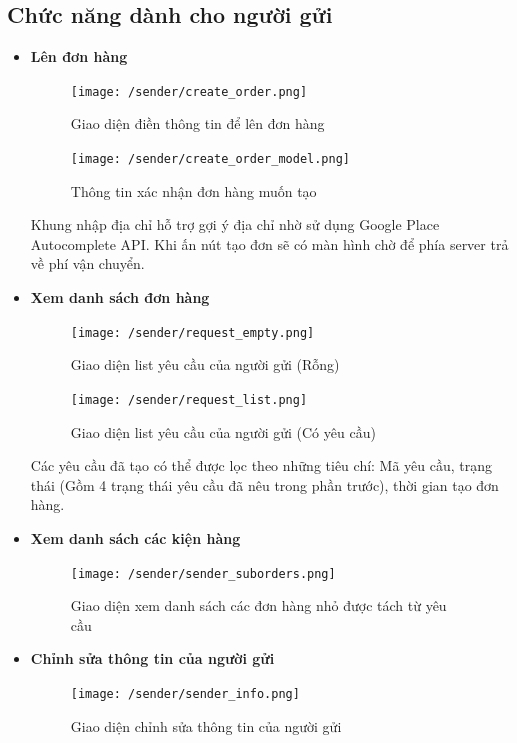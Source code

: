 \subsection{Chức năng dành cho người gửi}
	\begin{itemize}
		\item \textbf{Lên đơn hàng}
		\begin{figure}[H]
			\texttt{[image: /sender/create\_order.png]}
			\centering
			\caption{Giao diện điền thông tin để lên đơn hàng}
		\end{figure}
	
		\begin{figure}[H]
			\texttt{[image: /sender/create\_order\_model.png]}
			\centering
			\caption{Thông tin xác nhận đơn hàng muốn tạo}
		\end{figure}
		Khung nhập địa chỉ hỗ trợ gợi ý địa chỉ nhờ sử dụng Google Place Autocomplete API. Khi ấn nút tạo đơn sẽ có màn hình chờ để phía server trả về phí vận chuyển.
		
		\item \textbf{Xem danh sách đơn hàng}
		\begin{figure}[H]
			\texttt{[image: /sender/request\_empty.png]}
			\centering
			\caption{Giao diện list yêu cầu của người gửi (Rỗng)}
		\end{figure}
		
		\begin{figure}[H]
			\texttt{[image: /sender/request\_list.png]}
			\centering
			\caption{Giao diện list yêu cầu của người gửi (Có yêu cầu)}
		\end{figure}
		Các yêu cầu đã tạo có thể được lọc theo những tiêu chí: Mã yêu cầu, trạng thái (Gồm 4 trạng thái yêu cầu đã nêu trong phần trước), thời gian tạo đơn hàng.
		
		\item \textbf{Xem danh sách các kiện hàng}
		\begin{figure}[H]
			\texttt{[image: /sender/sender\_suborders.png]}
			\centering
			\caption{Giao diện xem danh sách các đơn hàng nhỏ được tách từ yêu cầu}
		\end{figure}
	
		\item \textbf{Chỉnh sửa thông tin của người gửi}
		
		\begin{figure}[H]
			\texttt{[image: /sender/sender\_info.png]}
			\centering
			\caption{Giao diện chỉnh sửa thông tin của người gửi}
		\end{figure}
		
		
	\end{itemize}


